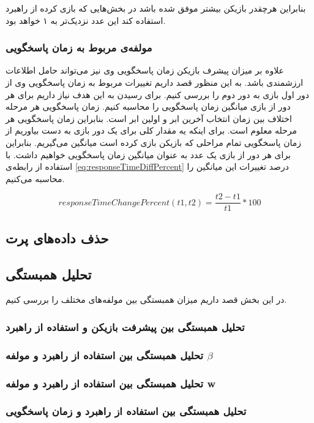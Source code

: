 \documentclass[twoside, a4paper,11pt]{book}
\numberwithin{equation}{chapter}
\numberwithin{table}{chapter}
\numberwithin{figure}{chapter}
\numberwithin{equation}{chapter}
\begin{document}
بنابراین هرچقدر بازیکن بیشتر موفق شده باشد در بخش‌هایی که بازی کرده از راهبرد استفاده کند این عدد نزدیک‌تر به ۱ خواهد بود.

\subsubsection{مولفه‌ی مربوط به زمان پاسخگویی}
علاوه بر میزان پیشرف بازیکن زمان پاسخگویی وی نیز می‌تواند حامل اطلاعات ارزشمندی باشد. به این منظور قصد داریم تغییرات مربوط به زمان پاسخگویی وی از دور اول بازی به دور دوم را بررسی کنیم. برای رسیدن به این هدف نیاز داریم برای هر دور از بازی میانگین زمان پاسخگویی را محاسبه کنیم. زمان پاسخگویی هر مرحله اختلاف بین زمان انتخاب آخرین ابر و اولین ابر است. بنابراین زمان پاسخگویی هر مرحله معلوم است. برای اینکه یه مقدار کلی برای یک دور بازی به دست بیاوریم از زمان پاسخگویی تمام مراحلی که بازیکن بازی کرده است میانگین می‌گیریم. بنابراین برای هر دور از بازی یک عدد به عنوان میانگین زمان پاسخگویی خواهیم داشت. با استفاده از رابطه‌ی \ref{eq:responseTimeDiffPercent} درصد تغییرات این میانگین را محاسبه می‌کنیم.

\begin{equation}
\label{eq:responseTimeDiffPercent}
	responseTimeChangePercent(t1, t2) = \frac{t2 - t1}{t1}*100
\end{equation}

\subsection{حذف داده‌های پرت} \label{removeOutlierSection}

\subsection{تحلیل همبستگی}
در این بخش قصد داریم میزان همبستگی بین مولفه‌های مختلف را بررسی کنیم.
\subsubsection{تحلیل همبستگی بین پیشرفت بازیکن و استفاده از راهبرد}
\subsubsection{تحلیل همبستگی بین استفاده از راهبرد و مولفه $\beta$}
\subsubsection{تحلیل همبستگی بین استفاده از راهبرد و مولفه w }
\subsubsection{تحلیل همبستگی بین استفاده از راهبرد و زمان پاسخگویی}
\end{document}
